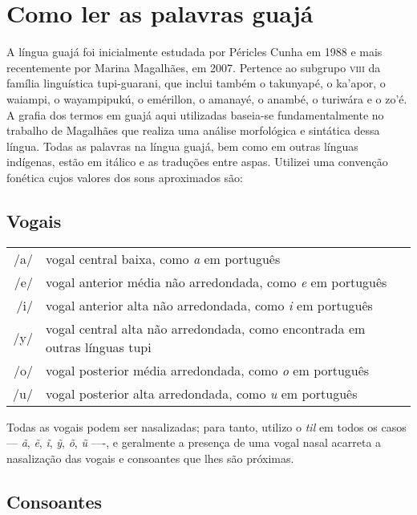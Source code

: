 \chapter{Como ler as palavras guajá}


A língua guajá foi inicialmente estudada por Péricles Cunha em 1988 e
mais recentemente por Marina Magalhães, em 2007. Pertence ao
subgrupo \textsc{viii} da família linguística tupi-guarani, que inclui também o
takunyapé, o ka'apor, o waiampi, o wayampipukú, o emérillon, o amanayé,
o anambé, o turiwára e o zo'é. %
A grafia dos termos em guajá aqui utilizadas baseia-se fundamentalmente no
trabalho de Magalhães que realiza uma análise morfológica e
sintática dessa língua. Todas as palavras na língua guajá, bem como em
outras línguas indígenas, estão em itálico e as traduções entre aspas.
Utilizei uma convenção fonética cujos valores dos sons aproximados são:

\section{Vogais}

\begin{tabular}{rl}
/a/ & vogal central baixa, como \textit{a} em português\\
/e/ & vogal anterior média não arredondada, como \textit{e} em português\\
/i/ & vogal anterior alta não arredondada, como \textit{i} em português\\
/y/ & vogal central alta não arredondada, como encontrada em outras línguas tupi\\
/o/ & vogal posterior média arredondada, como \textit{o} em português\\
/u/ & vogal posterior alta arredondada, como \textit{u} em português
\end{tabular} 


Todas as vogais podem ser nasalizadas; para tanto, utilizo o \textit{til} em
todos os casos --- \textit{ã}, \textit{ẽ}, \textit{ĩ}, \textit{ỹ}, \textit{õ}, \textit{ũ} ----, e geralmente a presença de uma
vogal nasal acarreta a nasalização das vogais e consoantes que lhes são
próximas.

\section{Consoantes}

